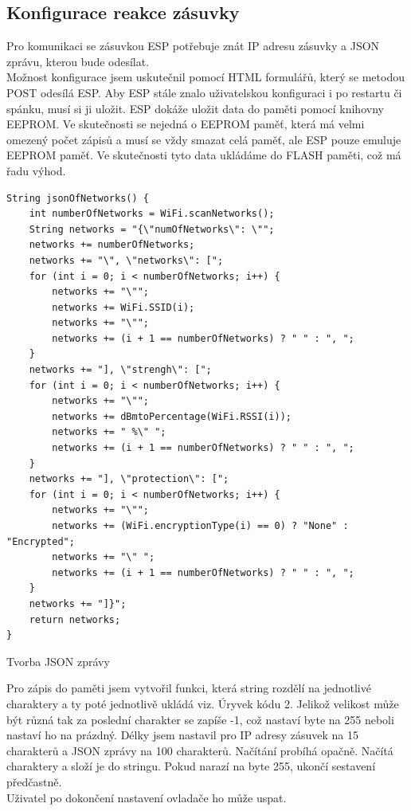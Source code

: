 \documentclass[a4paper, 12pt]{report}
\begin{document}
    \subsection{Konfigurace reakce zásuvky}
    Pro komunikaci se zásuvkou ESP potřebuje znát IP adresu zásuvky a JSON zprávu, kterou bude odesílat.\\ Možnost konfigurace jsem uskutečnil pomocí HTML formulářů, který se metodou POST odesílá ESP. Aby ESP stále znalo uživatelskou konfiguraci i po restartu či spánku, musí si ji uložit. ESP dokáže uložit data do paměti pomocí knihovny EEPROM. Ve skutečnosti se nejedná o EEPROM paměť, která má velmi omezený počet zápisů a musí se vždy smazat celá paměť, ale ESP pouze emuluje EEPROM paměť. Ve skutečnosti tyto data ukládáme do FLASH paměti, což má řadu výhod.\\
    \begin{listing}[]
        \begin{verbatim}
String jsonOfNetworks() {
    int numberOfNetworks = WiFi.scanNetworks();
    String networks = "{\"numOfNetworks\": \"";
    networks += numberOfNetworks;
    networks += "\", \"networks\": [";
    for (int i = 0; i < numberOfNetworks; i++) {
        networks += "\"";
        networks += WiFi.SSID(i);
        networks += "\"";
        networks += (i + 1 == numberOfNetworks) ? " " : ", ";
    }
    networks += "], \"strengh\": [";
    for (int i = 0; i < numberOfNetworks; i++) {
        networks += "\"";
        networks += dBmtoPercentage(WiFi.RSSI(i));
        networks += " %\" ";
        networks += (i + 1 == numberOfNetworks) ? " " : ", ";
    }
    networks += "], \"protection\": [";
    for (int i = 0; i < numberOfNetworks; i++) {
        networks += "\"";
        networks += (WiFi.encryptionType(i) == 0) ? "None" : "Encrypted";
        networks += "\" ";
        networks += (i + 1 == numberOfNetworks) ? " " : ", ";
    }
    networks += "]}";
    return networks;
}
        \end{verbatim}
        \label{lst:json}
        \caption{Tvorba JSON zprávy}
    \end{listing}
    Pro zápis do paměti jsem vytvořil funkci, která string rozdělí na jednotlivé charaktery a ty poté jednotlivě ukládá viz. Úryvek kódu 2. Jelikož velikost může být různá tak za poslední charakter se zapíše -1, což nastaví byte na 255 neboli nastaví ho na prázdný. Délky jsem nastavil pro IP adresy zásuvek na 15 charakterů a JSON zprávy na 100 charakterů. Načítání probíhá opačně. Načítá charaktery a složí je do stringu. Pokud narazí na byte 255, ukončí sestavení předčastně.\\
    Uživatel po dokončení nastavení ovladače ho může uspat.\\
\end{document}
